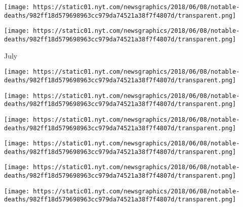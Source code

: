 \texttt{[image: https://static01.nyt.com/newsgraphics/2018/06/08/notable-deaths/982ff18d579698963cc979da74521a38f7f4807d/transparent.png]}

\href{https://www.nytimes.com/2018/08/05/obituaries/nancy-tuckerman-jackie-kennedys-trusted-aide-is-dead-at-89.html}{}

\texttt{[image: https://static01.nyt.com/newsgraphics/2018/06/08/notable-deaths/982ff18d579698963cc979da74521a38f7f4807d/transparent.png]}

July

\href{https://www.nytimes.com/2018/08/05/obituaries/tomasz-stanko-ruminative-jazz-trumpeter-dies-at-76.html}{}

\texttt{[image: https://static01.nyt.com/newsgraphics/2018/06/08/notable-deaths/982ff18d579698963cc979da74521a38f7f4807d/transparent.png]}

\href{https://www.nytimes.com/2018/08/01/obituaries/vladimir-voinovich-dissident-russian-writer-dies-at-85.html}{}

\texttt{[image: https://static01.nyt.com/newsgraphics/2018/06/08/notable-deaths/982ff18d579698963cc979da74521a38f7f4807d/transparent.png]}

\href{https://www.nytimes.com/2018/07/31/obituaries/tony-cloninger-pitcher-remembered-for-his-bat-dies-at-77.html}{}

\texttt{[image: https://static01.nyt.com/newsgraphics/2018/06/08/notable-deaths/982ff18d579698963cc979da74521a38f7f4807d/transparent.png]}

\href{https://www.nytimes.com/2018/07/30/obituaries/ron-dellums-forceful-liberal-in-congress-for-27-years-dies-at-82.html}{}

\texttt{[image: https://static01.nyt.com/newsgraphics/2018/06/08/notable-deaths/982ff18d579698963cc979da74521a38f7f4807d/transparent.png]}

\href{https://www.nytimes.com/2018/07/27/obituaries/mai-skaf-syrian-actress-who-defied-assad-regime-dies-at-49.html}{}

\texttt{[image: https://static01.nyt.com/newsgraphics/2018/06/08/notable-deaths/982ff18d579698963cc979da74521a38f7f4807d/transparent.png]}

\href{https://www.nytimes.com/2018/07/27/obituaries/bill-loud-dead-american-family.html}{}

\texttt{[image: https://static01.nyt.com/newsgraphics/2018/06/08/notable-deaths/982ff18d579698963cc979da74521a38f7f4807d/transparent.png]}

\href{https://www.nytimes.com/2018/07/26/obituaries/dr-kimishige-ishizaka-who-found-allergy-link-dies-at-92.html}{}

